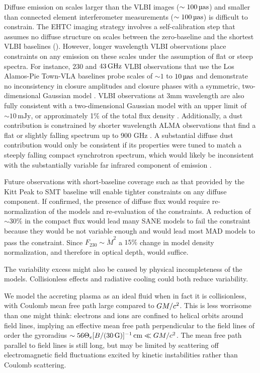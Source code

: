 Diffuse emission on scales larger than the VLBI images ($\sim 100\uas$) and smaller than connected element interferometer measurements ($\sim 100\uas$) is difficult to constrain.
The EHTC imaging strategy involves a self-calibration step that assumes no diffuse structure on scales between the zero-baseline and the shortest VLBI baselines ().
However, longer wavelength VLBI observations place constraints on any emission on these scales under the assumption of flat or steep spectra.
For instance, $230$ and $43\,\mathrm{GHz}$ VLBI observations that use the Los Alamos-Pie Town-VLA baselines probe scales of $\sim 1$ to $10\uas$ and demonstrate no inconsistency in closure amplitudes and closure phases with a symmetric, two-dimensional Gaussian model \citep{2004Sci...304..704B}.
VLBI observations at 3mm wavelength are also fully consistent with a two-dimensional Gaussian model with an upper limit of $\sim 10\,\mathrm{mJy}$, or approximately 1\% of the total flux density \citep{2019A&A...621A.119B}.
Additionally, a dust contribution is constrained by shorter wavelength ALMA observations that find a flat or slightly falling spectrum up to 900 GHz \citep{2019ApJ...881L...2B}.
A substantial diffuse dust contribution would only be consistent if its properties were tuned to match a steeply falling compact synchrotron spectrum, which would likely be inconsistent with the substantially variable far infrared component of \sgra emission \citep{2016ApJ...825...32S, 2018ApJ...862..129V}.

Future observations with short-baseline coverage such as that provided by the Kitt Peak to SMT baseline will enable tighter constraints on any diffuse component.
If confirmed, the presence of diffuse flux would require re-normalization of the models and re-evaluation of the constraints.
A reduction of $\sim 30\%$ in the compact flux would lead many SANE models to fail the  constraint because they would be not variable enough and would lead most MAD models to pass the  constraint.
Since $F_{230} \sim \dot{M}^2$ a $15\%$ change in model density normalization, and therefore in optical depth, would suffice.

The variability excess might also be caused by physical incompleteness of the models.
Collisionless effects and radiative cooling could both reduce variability.

We model the accreting plasma as an ideal fluid when in fact it is collisionless, with Coulomb mean free path large compared to $GM/c^2$.
This is less worrisome than one might think: electrons and ions are confined to helical orbits around field lines, implying an effective mean free path perpendicular to the field lines of order the gyroradius $\sim 56 \Theta_e [B/(30\,\mathrm{G})]^{-1} \,\mathrm{cm} \ll GM/c^2$.
The mean free path parallel to field lines is still long, but may be limited by scattering off electromagnetic field fluctuations excited by kinetic instabilities rather than Coulomb scattering.

